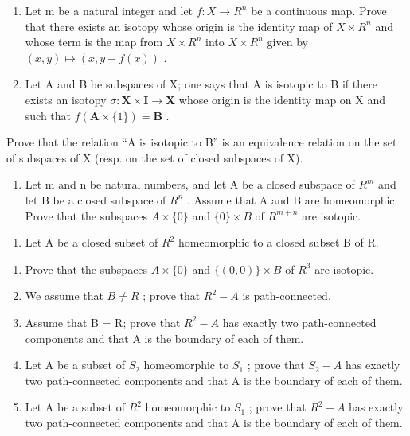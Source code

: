 \begin{enumerate}
\def\labelenumi{\alph{enumi})}
\item
  Let m be a natural integer and let \(f: X \to R^{n}\) be a continuous map. Prove that there exists an isotopy whose origin is the identity map of \(X \times R^{n}\) and whose term is the map from \(X \times R^{n}\) into \(X \times R^{n}\) given by \((x, y) \mapsto (x, y - f(x))\) .
\item
  Let A and B be subspaces of X; one says that A is isotopic to B if there exists an isotopy \(\sigma\colon\mathbf{X}\times\mathbf{I}\to\mathbf{X}\) whose origin is the identity map on X and such that \(f(\mathbf{A}\times\{1\})=\mathbf{B}\) .
\end{enumerate}

Prove that the relation “A is isotopic to B” is an equivalence relation on the set of subspaces of X (resp. on the set of closed subspaces of X).

\begin{enumerate}
\def\labelenumi{\alph{enumi})}
\setcounter{enumi}{2}
\tightlist
\item
  Let m and n be natural numbers, and let A be a closed subspace of \(R^{m}\) and let B be a closed subspace of \(R^{n}\) . Assume that A and B are homeomorphic. Prove that the subspaces \(A \times \{0\}\) and \(\{0\} \times B\) of \(R^{m+n}\) are isotopic.
\end{enumerate}

\begin{enumerate}
\def\labelenumi{\arabic{enumi})}
\setcounter{enumi}{28}
\tightlist
\item
  Let A be a closed subset of \(R^{2}\) homeomorphic to a closed subset B of R.
\end{enumerate}

\begin{enumerate}
\def\labelenumi{\alph{enumi})}
\item
  Prove that the subspaces \(A \times \{0\}\) and \(\{(0,0)\} \times B\) of \(R^{3}\) are isotopic.
\item
  We assume that \(B \neq R\) ; prove that \(R^{2}-A\) is path-connected.
\item
  Assume that B = R; prove that \(R^{2}-A\) has exactly two path-connected components and that A is the boundary of each of them.
\item
  Let A be a subset of \(S_{2}\) homeomorphic to \(S_{1}\) ; prove that \(S_{2} - A\) has exactly two path-connected components and that A is the boundary of each of them.
\item
  Let A be a subset of \(R^{2}\) homeomorphic to \(S_{1}\) ; prove that \(R^{2}-A\) has exactly two path-connected components and that A is the boundary of each of them.
\end{enumerate}

